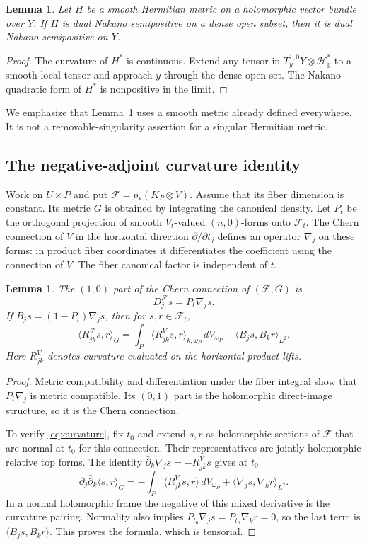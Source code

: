 \documentclass[11pt,reqno]{amsart}
\numberwithin{equation}{section}
\newtheorem{lemma}[theorem]{Lemma}
\theoremstyle{definition}
\theoremstyle{remark}
\newcommand{\db}{\bar\partial}
\newcommand{\cH}{\mathcal H}
\newcommand{\cF}{\mathcal F}
\newcommand{\dV}{\,dV}
\newcommand{\ip}[2]{\langle #1,#2\rangle}
\begin{document}
\begin{lemma}\label{lem:extension}
Let $H$ be a smooth Hermitian metric on a holomorphic vector bundle over $Y$. If $H$ is dual Nakano semipositive on a dense open subset, then it is dual Nakano semipositive on $Y$.
\end{lemma}
\begin{proof}
The curvature of $H^*$ is continuous. Extend any tensor in $T_y^{1,0}Y\otimes\cH_y^*$ to a smooth local tensor and approach $y$ through the dense open set. The Nakano quadratic form of $H^*$ is nonpositive in the limit.
\end{proof}

We emphasize that Lemma~\ref{lem:extension} uses a smooth metric already defined everywhere. It is not a removable-singularity assertion for a singular Hermitian metric.


\subsection{The negative-adjoint curvature identity}
Work on $U\times P$ and put $\cF=p_*(K_P\otimes V)$. Assume that its fiber dimension is constant. Its metric $G$ is obtained by integrating the canonical density. Let $P_t$ be the orthogonal projection of smooth $V_t$-valued $(n,0)$-forms onto $\cF_t$. The Chern connection of $V$ in the horizontal direction $\partial/\partial t_j$ defines an operator $\nabla_j$ on these forms: in product fiber coordinates it differentiates the coefficient using the connection of $V$. The fiber canonical factor is independent of $t$.

\begin{lemma}\label{lem:projected}
The $(1,0)$ part of the Chern connection of $(\cF,G)$ is
\[
 D^{\cF}_j s=P_t\nabla_j s.
\]
If $B_js=(1-P_t)\nabla_js$, then for $s,r\in\cF_t$,
\begin{equation}\label{eq:curvature}
 \ip{R^{\cF}_{j\bar k}s}{r}_G
 =\int_P\ip{R^V_{j\bar k}s}{r}_{k,\omega_P}\dV_{\omega_P}
   -\ip{B_js}{B_kr}_{L^2}.
\end{equation}
Here $R^V_{j\bar k}$ denotes curvature evaluated on the horizontal product lifts.
\end{lemma}
\begin{proof}
Metric compatibility and differentiation under the fiber integral show that $P_t\nabla_j$ is metric compatible. Its $(0,1)$ part is the holomorphic direct-image structure, so it is the Chern connection.

To verify \eqref{eq:curvature}, fix $t_0$ and extend $s,r$ as holomorphic sections of $\cF$ that are normal at $t_0$ for this connection. Their representatives are jointly holomorphic relative top forms. The identity $\db_k\nabla_js=-R^V_{j\bar k}s$ gives at $t_0$
\[
 \partial_j\bar\partial_k\ip{s}{r}_G
 =-\int_P\ip{R^V_{j\bar k}s}{r}\dV_{\omega_P}
   +\ip{\nabla_js}{\nabla_kr}_{L^2}.
\]
In a normal holomorphic frame the negative of this mixed derivative is the curvature pairing. Normality also implies $P_{t_0}\nabla_js=P_{t_0}\nabla_kr=0$, so the last term is $\ip{B_js}{B_kr}$. This proves the formula, which is tensorial.
\end{proof}
\end{document}
